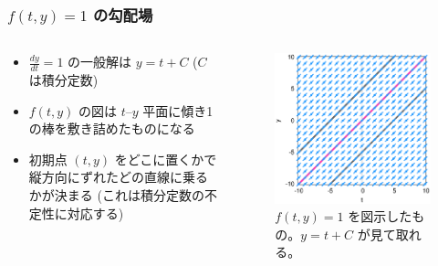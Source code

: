 \documentclass[dvipdfmx,aspectratio=169,20pt]{beamer}
\newcommand{\myfontsetting}[3]{{\fontsize{#1}{#2}\selectfont #3}}
\begin{document}
\begin{frame}
\frametitle{\myfontsetting{28pt}{28pt}{[図解] $f(t,y) = 1$ の勾配場}}
\begin{columns}[t]
\begin{column}{0.48\textwidth} 
\vspace{-8mm}
\begin{itemize}
    \item 
    \myfontsetting{12pt}{12pt}{
    $\frac{dy}{dt} = 1$ の一般解は $y=t+C$ \myfontsetting{10pt}{10pt}{($C$ は積分定数)}
    }
    \vspace{-1mm}
    \item 
    \myfontsetting{12pt}{12pt}{
    $f(t,y)$ の図は $t$--$y$ 平面に傾き1の棒を敷き詰めたものになる
    }
    \vspace{-1mm}
    \item \myfontsetting{12pt}{12pt}{
        初期点 $(t,y)$ をどこに置くかで縦方向にずれたどの直線に乗るかが決まる
        \myfontsetting{10pt}{10pt}{(これは積分定数の不定性に対応する)}
        }
\end{itemize}
\end{column}

\begin{column}{0.52\textwidth} 
\begin{figure}[h]
	\begin{center}
\vspace{-10mm}
    	\includegraphics[width=1.0\textwidth]{fig12-2_differential_equation_const.eps}
	\end{center}
	\vspace{-5mm}
	\caption{\myfontsetting{10pt}{10pt}{$f(t,y)=1$ を図示したもの。$y=t+C$ が見て取れる。}}
\end{figure}
\end{column}
\end{columns}
\end{frame}
\end{document}
